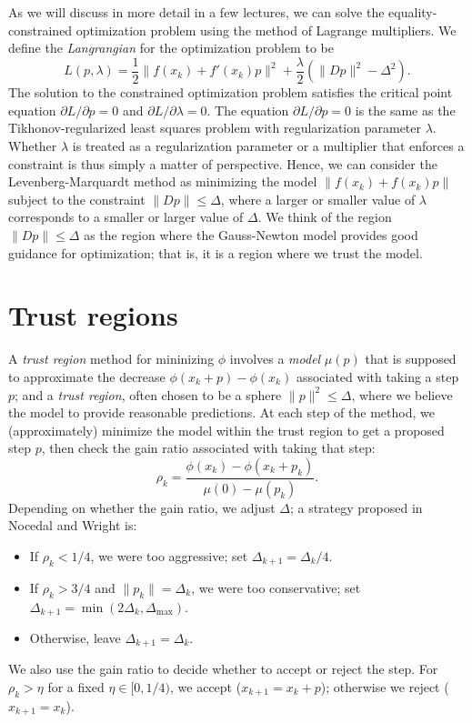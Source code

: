 \documentclass[12pt, leqno]{article} %
\begin{document}
As we will discuss in more detail in a few lectures,
we can solve the equality-constrained optimization problem using
the method of Lagrange multipliers.  We define the {\em Langrangian}
for the optimization problem to be
\[
  L(p,\lambda) =
    \frac{1}{2} \|f(x_k)+f'(x_k) p\|^2 +
    \frac{\lambda}{2} \left( \|Dp\|^2-\Delta^2 \right).
\]
The solution to the constrained optimization problem satisfies the
critical point equation $\partial L/\partial p = 0$ and
$\partial L/\partial \lambda = 0$.  The equation
$\partial L/\partial p = 0$ is the same as the Tikhonov-regularized
least squares problem with regularization parameter $\lambda$.
Whether $\lambda$ is treated as a regularization parameter or a
multiplier that enforces a constraint is thus simply a matter of
perspective.  Hence, we can consider the Levenberg-Marquardt method
as minimizing the model $\|f(x_k) + f(x_k) p\|$ subject to the
constraint $\|Dp\| \leq \Delta$, where a larger or smaller value
of $\lambda$ corresponds to a smaller or larger value of $\Delta$.
We think of the region $\|Dp\| \leq \Delta$ as the region where
the Gauss-Newton model provides good guidance for optimization;
that is, it is a region where we trust the model.

\section{Trust regions}

A {\em trust region} method for mininizing $\phi$
involves a {\em model} $\mu(p)$ that is supposed to approximate
the decrease $\phi(x_k+p)-\phi(x_k)$ associated with taking a step
$p$; and a {\em trust region}, often chosen to be a sphere
$\|p\|^2 \leq \Delta$, where we believe the model to provide
reasonable predictions.  At each step of the method, we
(approximately) minimize the model within the trust region to
get a proposed step $p$, then check the gain ratio 
associated with taking that step:
\[
  \rho_k = \frac{\phi(x_k)-\phi(x_k+p_k)}{\mu(0)-\mu(p_k)}.
\]
Depending on whether the gain ratio, we adjust $\Delta$;
a strategy proposed in Nocedal and Wright is:
\begin{itemize}
\item If $\rho_k < 1/4$, we were too aggressive; set $\Delta_{k+1} =
  \Delta_k/4$.
\item If $\rho_k > 3/4$ and $\|p_k\| = \Delta_k$, we were too
  conservative; set $\Delta_{k+1} = \min(2\Delta_k, \Delta_{\max})$.
\item Otherwise, leave $\Delta_{k+1} = \Delta_k$.
\end{itemize}
We also use the gain ratio to decide whether to accept or reject
the step.  For $\rho_k > \eta$ for a fixed $\eta \in [0,1/4)$, we
accept ($x_{k+1} = x_k+p$); otherwise we reject ($x_{k+1} = x_k$).
\end{document}
